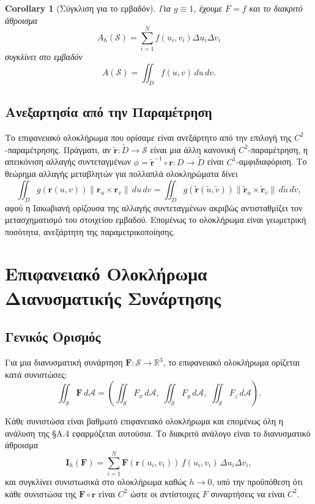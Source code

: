 \documentclass[10pt,a4paper,twoside,openany]{book}
\theoremstyle{plain}
\newtheorem{corollary}[theorem]{Corollary}
\theoremstyle{definition}
\theoremstyle{remark}
\numberwithin{equation}{section}
\begin{document}
\begin{corollary}[Σύγκλιση για το εμβαδόν]
Για \(g \equiv 1\), έχουμε \(F = f\) και το διακριτό άθροισμα
\[
A_h(\mathcal{S}) = \sum_{i=1}^N f(u_i, v_i) \Delta u_i \Delta v_i
\]
συγκλίνει στο εμβαδόν
\[
A(\mathcal{S}) = \iint_D f(u,v) \, du \, dv.
\]
\end{corollary}

\subsection{Ανεξαρτησία από την Παραμέτρηση}

Το επιφανειακό ολοκλήρωμα που ορίσαμε είναι ανεξάρτητο από την επιλογή της \(C^2\)-παραμέτρησης. Πράγματι, αν \(\tilde{\mathbf{r}} : \tilde{D} \to \mathcal{S}\) είναι μια άλλη κανονική \(C^2\)-παραμέτρηση, η απεικόνιση αλλαγής συντεταγμένων \(\phi = \tilde{\mathbf{r}}^{-1} \circ \mathbf{r} : D \to \tilde{D}\) είναι \(C^1\)-αμφιδιαφόριση. Το θεώρημα αλλαγής μεταβλητών για πολλαπλά ολοκληρώματα δίνει
\[
\iint_D g(\mathbf{r}(u,v)) \|\mathbf{r}_u \times \mathbf{r}_v\| \, du \, dv = \iint_{\tilde{D}} g(\tilde{\mathbf{r}}(\tilde{u},\tilde{v})) \|\tilde{\mathbf{r}}_{\tilde{u}} \times \tilde{\mathbf{r}}_{\tilde{v}}\| \, d\tilde{u} \, d\tilde{v},
\]
αφού η Ιακωβιανή ορίζουσα της αλλαγής συντεταγμένων ακριβώς αντισταθμίζει τον μετασχηματισμό του στοιχείου εμβαδού. Επομένως το ολοκλήρωμα είναι γεωμετρική ποσότητα, ανεξάρτητη της παραμετρικοποίησης.

\section{Επιφανειακό Ολοκλήρωμα Διανυσματικής Συνάρτησης}

\subsection{Γενικός Ορισμός}

Για μια διανυσματική συνάρτηση \(\mathbf{F} : \mathcal{S} \to \mathbb{R}^3\), το επιφανειακό ολοκλήρωμα ορίζεται κατά συνιστώσες:
\[
\iint_{\mathcal{S}} \mathbf{F} \, d\mathcal{A} = \left( \iint_{\mathcal{S}} F_x \, d\mathcal{A}, \; \iint_{\mathcal{S}} F_y \, d\mathcal{A}, \; \iint_{\mathcal{S}} F_z \, d\mathcal{A} \right).
\]

Κάθε συνιστώσα είναι βαθμωτό επιφανειακό ολοκλήρωμα και επομένως όλη η ανάλυση της §Α.4 εφαρμόζεται αυτούσια. Το διακριτό ανάλογο είναι το διανυσματικό άθροισμα
\[
\mathbf{I}_h(\mathbf{F}) = \sum_{i=1}^N \mathbf{F}(\mathbf{r}(u_i, v_i)) \, f(u_i, v_i) \, \Delta u_i \Delta v_i,
\]
και συγκλίνει συνιστωσικά στο ολοκλήρωμα καθώς \(h \to 0\), υπό την προϋπόθεση ότι κάθε συνιστώσα της \(\mathbf{F} \circ \mathbf{r}\) είναι \(C^2\) ώστε οι αντίστοιχες \(F\) συναρτήσεις να είναι \(C^2\).
\end{document}
